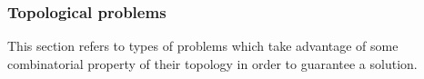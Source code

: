 \begin{table}[h!]
    \centering
     \quad

    \caption{Three-valued logic \cite{kleene_IntroductionMetamathematics_2009}}\label{tab:three-val-logic}
\end{table}

%

%

\subsubsection{Topological problems}

This section refers to types of problems which take advantage of some combinatorial property
of their topology in order to guarantee a solution.


